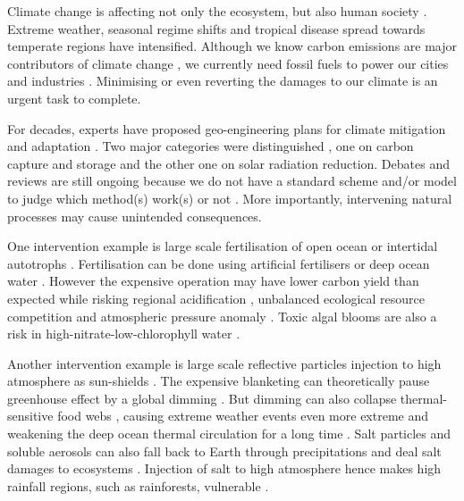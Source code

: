 \documentclass[../thesis.tex]{subfiles} %
\begin{document}
Climate change is affecting not only the ecosystem, but also human society \autocite{notz2016observed,schuur2015climate}.  Extreme weather, seasonal regime shifts and tropical disease spread towards temperate regions have intensified.  Although we know carbon emissions are major contributors of climate change \autocite{notz2016observed}, we currently need fossil fuels to power our cities and industries \autocite{ferguson2000electricity}.  Minimising or even reverting the damages to our climate is an urgent task to complete.

For decades, experts have proposed geo-engineering plans for climate mitigation and adaptation \autocite{farrelly2013carbon,yang2008progress,boyd2008ranking,boettcher2019high,vaughan2011review}.  Two major categories were distinguished \autocite{boyd2008ranking}, one on carbon capture and storage and the other one on solar radiation reduction.  Debates and reviews are still ongoing because we do not have a standard scheme and/or model to judge which method(s) work(s) or not \autocite{boyd2008ranking,boettcher2019high,boyd2016development,oschlies2017indicators,gattuso2018ocean}.  More importantly, intervening natural processes may cause unintended consequences.

One intervention example is large scale fertilisation of open ocean \autocite{gnanadesikan2008export,lovelock2007ocean,lawrence2014efficiency} or intertidal autotrophs \autocite{duarte2017can,johannessen2016geoengineering,krause2016substantial}.  Fertilisation can be done using artificial fertilisers \autocite{gnanadesikan2008export,lawrence2014efficiency,trick2010iron} or deep ocean water \autocite{kwiatkowski2015atmospheric,lovelock2007ocean}.  However the expensive operation may have lower carbon yield than expected \autocite{boyd2008implications,gnanadesikan2008export,oschlies2010side} while risking regional acidification \autocite{oschlies2010side}, unbalanced ecological resource competition \autocite{chung2011using,thiele2012microbial,batten2014did} and atmospheric pressure anomaly \autocite{kwiatkowski2015atmospheric}.  Toxic algal blooms are also a risk in high-nitrate-low-chlorophyll water \autocite{trick2010iron}.

Another intervention example is large scale reflective particles injection to high atmosphere as sun-shields \autocite{latham2008global,stjern2018response,xia2016stratospheric}.  The expensive blanketing \autocite{boyd2008implications} can theoretically pause greenhouse effect by a global dimming \autocite{williamson2012impacts}.  But dimming can also collapse thermal-sensitive food webs \autocite{williamson2012impacts}, causing extreme weather events even more extreme \autocite{jones2009climate} and weakening the deep ocean thermal circulation for a long time \autocite{lauvset2017climate,williamson2012impacts}.  Salt particles and soluble aerosols can also fall back to Earth through precipitations and deal salt damages to ecosystems \autocite{bala2011albedo}.  Injection of salt to high atmosphere hence makes high rainfall regions, such as rainforests, vulnerable \autocite{muri2015tropical}.
\end{document}
